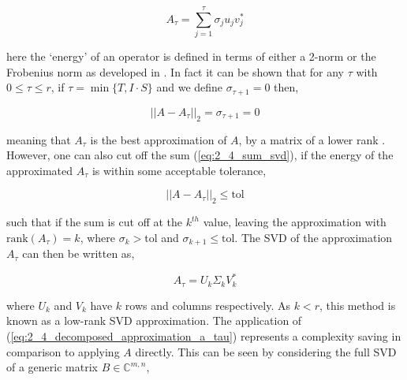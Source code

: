 \begin{equation}
    A_\tau = \sum_{j=1}^{\tau}\sigma_j u_j v_j^*
    \label{eq:2_4_sum_svd}
\end{equation}

here the `energy' of an operator is defined in terms of either a 2-norm or the
Frobenius norm as developed in \cite{Trefethen:1997:SIAM}. In fact it can be shown
that for any $\tau$ with $0 \leq \tau \leq r$, if $\tau = \min \{T, I \cdot S\}$
and we define $\sigma_{\tau + 1} = 0$ then,

\begin{equation}
    ||A - A_\tau ||_2 = \sigma_{\tau+1} = 0
\end{equation}

meaning that $A_\tau$ is the best approximation of $A$, by a matrix of a lower rank
\cite{Trefethen:1997:SIAM}. However, one can also cut off the sum (\ref{eq:2_4_sum_svd}),
if the energy of the approximated $A_\tau$ is within some acceptable tolerance,

\begin{equation}
    ||A - A_\tau ||_2  \leq  \text{tol}
    \label{eq:2_4_svd_tol}
\end{equation}

such that if the sum is cut off at the $k^{th}$ value, leaving the approximation with
$\text{rank}(A_\tau) = k$, where $\sigma_k > \text{tol}$ and
$\sigma_{k+1} \leq \text{tol}$. The \gls{SVD} of the approximation $A_\tau$ can
then be written as,

\begin{equation}
    A_\tau = U_k \Sigma_k V_k^*
    \label{eq:2_4_decomposed_approximation_a_tau}
\end{equation}

where $U_k$ and $V_k$ have $k$ rows and columns respectively. As $k < r$, this
method is known as a low-rank SVD approximation. The application of
(\ref{eq:2_4_decomposed_approximation_a_tau}) represents a complexity saving in
comparison to applying $A$ directly. This can be seen by considering the full
SVD of a generic matrix $B \in \mathbb{C}^{m, n}$,

